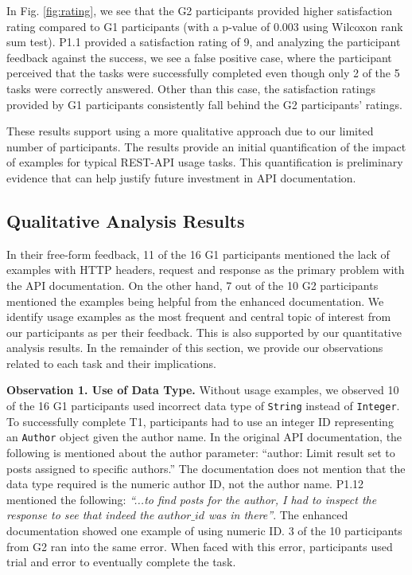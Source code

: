 In Fig. \ref{fig:rating}, we see that the G2 participants provided higher satisfaction rating compared to G1 participants (with a p-value of 0.003 using Wilcoxon rank sum test). P1.1 provided a satisfaction rating of 9, and analyzing the participant feedback against the success, we see a false positive case, where the participant perceived that the tasks were successfully completed even though only 2 of the 5 tasks were correctly answered. Other than this case, the satisfaction ratings provided by G1 participants consistently fall behind the G2 participants' ratings.

These results support using a more qualitative approach due to our limited number of participants. The results provide an initial quantification of the impact of examples for typical REST-API usage tasks. This quantification is preliminary evidence that can help justify future investment in API documentation.


\subsection{Qualitative Analysis Results} %

In their free-form feedback, 11 of the 16 G1 participants mentioned the lack of examples with HTTP headers, request and response as the primary problem with the API documentation. On the other hand, 7 out of the 10 G2 participants mentioned the examples being helpful from the enhanced documentation. We identify usage examples as the most frequent and central topic of interest from our participants as per their feedback. This is also supported by our quantitative analysis results. In the remainder of this section, we provide our observations related to each task and their implications.


\textbf{Observation 1. Use of Data Type.} Without usage examples, we observed 10 of the 16 G1 participants used incorrect data type of \lstinline{String} instead of \lstinline{Integer}. To successfully complete T1, participants had to use an integer ID representing an \lstinline{Author} object given the author name. In the original API documentation, the following is mentioned about the author parameter: ``author: Limit result set to posts assigned to specific authors.'' The documentation does not mention that the data type required is the numeric author ID, not the author name. P1.12 mentioned the following: \textit{``...to find posts for the author, I had to inspect the response to see that indeed the $author\_id$ was in there''}. The enhanced documentation showed one example of using numeric ID. 3 of the 10 participants from G2 ran into the same error. When faced with this error, participants used trial and error to eventually complete the task.

